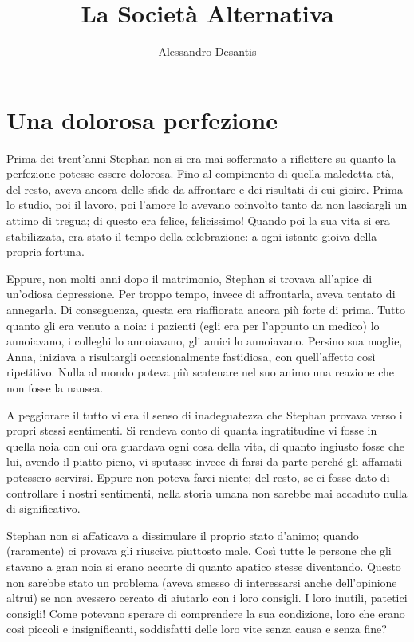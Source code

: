 \documentclass[a4paper,11pt,oneside]{memoir}
\title{La Società Alternativa}
\author{Alessandro Desantis}
\begin{document}
\begin{titlingpage}
\maketitle
\end{titlingpage}

\chapter{Una dolorosa perfezione}

Prima dei trent'anni Stephan non si era mai soffermato a riflettere su quanto la
perfezione potesse essere dolorosa. Fino al compimento di quella maledetta età,
del resto, aveva ancora delle sfide da affrontare e dei risultati di cui gioire.
Prima lo studio, poi il lavoro, poi l'amore lo avevano coinvolto tanto da non
lasciargli un attimo di tregua; di questo era felice, felicissimo! Quando poi la
sua vita si era stabilizzata, era stato il tempo della celebrazione: a ogni
istante gioiva della propria fortuna.

Eppure, non molti anni dopo il matrimonio, Stephan si trovava all'apice di
un'odiosa depressione. Per troppo tempo, invece di affrontarla, aveva tentato di
annegarla. Di conseguenza, questa era riaffiorata ancora più forte di prima.
Tutto quanto gli era venuto a noia: i pazienti (egli era per l'appunto un
medico) lo annoiavano, i colleghi lo annoiavano, gli amici lo annoiavano.
Persino sua moglie, Anna, iniziava a risultargli occasionalmente fastidiosa, con
quell'affetto così ripetitivo. Nulla al mondo poteva più scatenare nel suo animo
una reazione che non fosse la nausea.

A peggiorare il tutto vi era il senso di inadeguatezza che Stephan provava verso
i propri stessi sentimenti. Si rendeva conto di quanta ingratitudine vi fosse in
quella noia con cui ora guardava ogni cosa della vita, di quanto ingiusto fosse
che lui, avendo il piatto pieno, vi sputasse invece di farsi da parte perché gli
affamati potessero servirsi. Eppure non poteva farci niente; del resto, se ci
fosse dato di controllare i nostri sentimenti, nella storia umana non sarebbe
mai accaduto nulla di significativo.

Stephan non si affaticava a dissimulare il proprio stato d'animo; quando
(raramente) ci provava gli riusciva piuttosto male. Così tutte le persone che
gli stavano a gran noia si erano accorte di quanto apatico stesse diventando.
Questo non sarebbe stato un problema (aveva smesso di interessarsi anche
dell'opinione altrui) se non avessero cercato di aiutarlo con i loro consigli.
I loro inutili, patetici consigli! Come potevano sperare di comprendere la sua
condizione, loro che erano così piccoli e insignificanti, soddisfatti delle loro
vite senza causa e senza fine?
\end{document}
